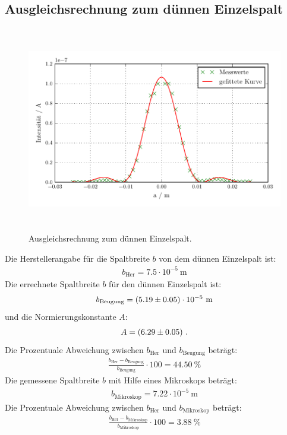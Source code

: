\subsection{Ausgleichsrechnung zum dünnen Einzelspalt}
\begin{figure}[H] %
  \centering
  \includegraphics[height=9cm]{build/plot1.pdf}
  \caption{Ausgleichsrechnung zum dünnen Einzelspalt.}
  \label{fig:Einzel1}
\end{figure}

Die Herstellerangabe für die Spaltbreite $b$ von dem dünnen Einzelspalt ist:
\begin{align*}
  b_\text{Her} = 7.5 \cdot 10^{-5} \ \text{m}
\end{align*}
Die errechnete Spaltbreite $b$ für den dünnen Einzelspalt ist:
\begin{align*}
  b_\text{Beugung} = (\num{5.19 +- 0.05}) \cdot 10^{-5} \ \text{m}
\end{align*}
und die Normierungskonstante $A$:
\begin{align*}
  A = (\num{6.29 +- 0.05}) \ .
\end{align*}
Die Prozentuale Abweichung zwischen $b_\text{Her}$ und $b_\text{Beugung}$ beträgt:
\begin{align*}
  \frac{b_\text{Her}-b_\text{Beugung}}{b_\text{Beugung}} \cdot 100 = 44.50 \ \%
\end{align*}
Die gemessene Spaltbreite $b$ mit Hilfe eines Mikroskops beträgt:
\begin{align*}
  b_\text{Mikroskop} = 7.22 \cdot 10^{-5} \ \text{m}
\end{align*}
Die Prozentuale Abweichung zwischen $b_\text{Her}$ und $b_\text{Mikroskop}$ beträgt:
\begin{align*}
  \frac{b_\text{Her}-b_\text{Mikroskop}}{b_\text{Mikroskop}} \cdot 100 = 3.88 \ \%
\end{align*}


